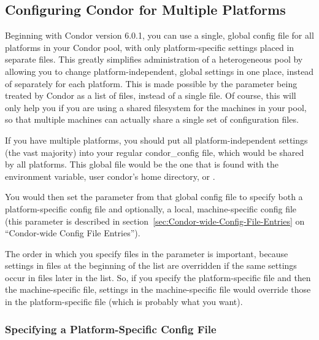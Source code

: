 \subsection{\label{sec:Multiple-Platforms}Configuring Condor for
Multiple Platforms} 

Beginning with Condor version 6.0.1, you can use a single, global
config file for all platforms in your Condor pool, with only
platform-specific settings placed in separate files.  This greatly
simplifies administration of a heterogeneous pool by allowing you to
change platform-independent, global settings in one place, instead of
separately for each platform.  This is made possible by the
 parameter being treated by Condor as a
list of files, instead of a single file.  Of course, this will only
help you if you are using a shared filesystem for the machines in your
pool, so that multiple machines can actually share a single set of
configuration files.

If you have multiple platforms, you should put all
platform-independent settings (the vast majority) into your regular
condor\_config file, which would be shared by all platforms.  This
global file would be the one that is found with the
 environment variable, user condor's home
directory, or .

You would then set the  parameter from that
global config file to specify both a platform-specific config file and
optionally, a local, machine-specific config file (this parameter is
described in section~\ref{sec:Condor-wide-Config-File-Entries} on
``Condor-wide Config File Entries'').

The order in which you specify files in the
 parameter is important, because settings
in files at the beginning of the list are overridden if the same
settings occur in files later in the list.  So, if you specify the
platform-specific file and then the machine-specific file, settings in
the machine-specific file would override those in the
platform-specific file (which is probably what you want).  

\subsubsection{\label{sec:Specify-Platform-Files}Specifying a
Platform-Specific Config File} 

